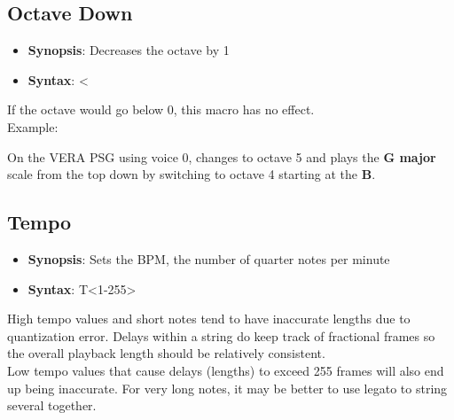 \subsection{Octave Down}

\begin{itemize}

	\item {\bfseries Synopsis}: Decreases the octave by 1

	\item {\bfseries Syntax}: {\ttfamily <}

\end{itemize}

\vspace{16pt}

If the octave would go below 0, this macro has no effect.\\

Example:\\


On the VERA PSG using voice 0, changes to octave 5 and plays the
{\ttfamily\bfseries G major} scale from the top down by switching to octave 4
starting at the {\ttfamily\bfseries B}.\\

\subsection{Tempo}

\begin{itemize}

	\item {\bfseries Synopsis}: Sets the BPM, the number of quarter notes per minute

	\item {\bfseries Syntax}: {\ttfamily T<1-255>}

\end{itemize}

\vspace{16pt}

High tempo values and short notes tend to have inaccurate lengths due to
quantization error. Delays within a string do keep track of fractional frames
so the overall playback length should be relatively consistent.\\

Low tempo values that cause delays (lengths) to exceed 255 frames will also end
up being inaccurate. For very long notes, it may be better to use legato to
string several together.\\

